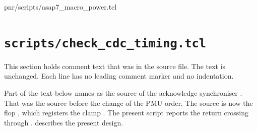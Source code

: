 \begin{relocated}{pnr/scripts/asap7_macro_power.tcl}

\end{relocated}

\section{\texttt{scripts/check\_cdc\_timing.tcl}}\label{tm:pd:scripts-check-cdc-timing-tcl}

This section holds comment text that was in the source file. The text is unchanged. Each line has no leading comment marker and no indentation.

\begin{information}
Part of the text below names  as the source of the acknowledge synchroniser . That was the source before the change of the PMU order. The source is now the flop , which registers the clamp . The present script reports the return crossing through .  describes the present design.
\end{information}

